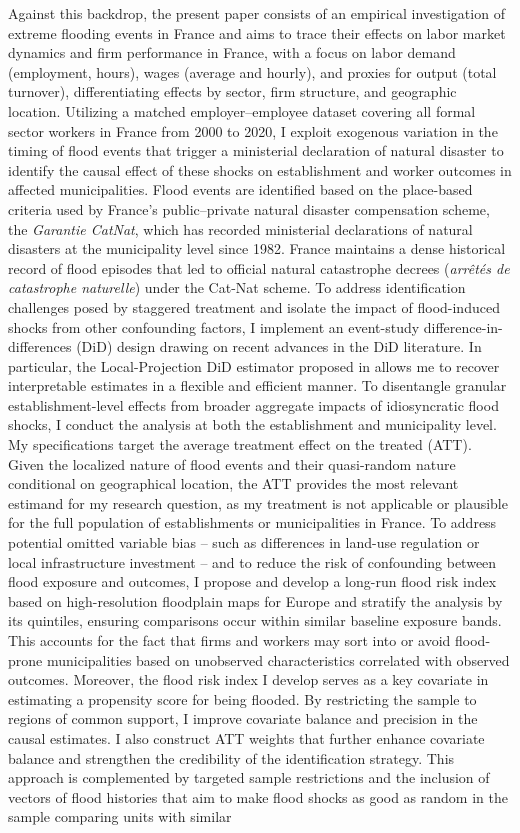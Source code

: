 Against this backdrop, the present paper consists of an empirical investigation of extreme flooding events in France and aims to trace their effects on labor market dynamics and firm performance in France, with a focus on labor demand (employment, hours), wages (average and hourly), and proxies for output (total turnover), differentiating effects by sector, firm structure, and geographic location. Utilizing a matched employer–employee dataset covering all formal sector workers in France from 2000 to 2020, I exploit exogenous variation in the timing of flood events that trigger a ministerial declaration of natural disaster to identify the causal effect of these shocks on establishment and worker outcomes in affected municipalities. Flood events are identified based on the place-based criteria used by France’s public–private natural disaster compensation scheme, the \textit{Garantie CatNat}, which has recorded ministerial declarations of natural disasters at the municipality level since 1982. France maintains a dense historical record of flood episodes that led to official natural catastrophe decrees (\textit{arrêtés de catastrophe naturelle}) under the Cat-Nat scheme. To address identification challenges posed by staggered treatment and isolate the impact of flood-induced shocks from other confounding factors, I implement an event-study difference-in-differences (DiD) design drawing on recent advances in the DiD literature. In particular, the Local-Projection DiD estimator proposed in \cite{dube2023local} allows me to recover interpretable estimates in a flexible and efficient manner. To disentangle granular establishment-level effects from broader aggregate impacts of idiosyncratic flood shocks, I conduct the analysis at both the establishment and municipality level. My specifications target the average treatment effect on the treated (ATT). Given the localized nature of flood events and their quasi-random nature conditional on geographical location, the ATT provides the most relevant estimand for my research question, as my treatment is not applicable or plausible for the full population of establishments or municipalities in France. To address potential omitted variable bias -- such as differences in land-use regulation or local infrastructure investment -- and to reduce the risk of confounding between flood exposure and outcomes, I propose and develop a long-run flood risk index based on high-resolution floodplain maps for Europe and stratify the analysis by its quintiles, ensuring comparisons occur within similar baseline exposure bands. This accounts for the fact that firms and workers may sort into or avoid flood-prone municipalities based on unobserved characteristics correlated with observed outcomes. Moreover, the flood risk index I develop serves as a key covariate in estimating a propensity score for being flooded. By restricting the sample to regions of common support, I improve covariate balance and precision in the causal estimates. I also construct ATT weights that further enhance covariate balance and strengthen the credibility of the identification strategy. This approach is complemented by targeted sample restrictions and the inclusion of vectors of flood histories that aim to make flood shocks as good as random in the sample comparing units with similar 